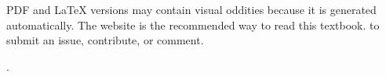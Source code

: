 \documentclass[letterpaper,10pt,english]{sphinxmanual}
\begin{document}
\begin{footnote}[1]\sphinxAtStartFootnote
PDF and LaTeX versions may contain visual oddities because it is generated automatically. The website is the recommended way to read this textbook.  to submit an issue, contribute, or comment.
%
\end{footnote}.
\paragraph{}



\renewcommand{\indexname}{Index}
\printindex
\end{document}
